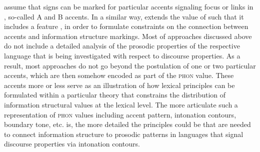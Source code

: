 \documentclass[output=paper,biblatex,babelshorthands,newtxmath,draftmode,colorlinks,citecolor=brown]{langscibook}
\begin{document}
\citet{EV96a} assume that signs can be marked for particular accents
signaling focus or links in , so-called A and B accents.
In a similar way, \citet{deKuthy2002a} extends the value of
 such that it includes a feature
, in order to formulate constraints on
the connection between accents and information structure markings.
Most of approaches discussed above do not include a detailed analysis
of the prosodic properties of the respective language that is being
investigated with respect to discourse properties. As a result, most
approaches do not go beyond the postulation of one or two particular
accents, which are then somehow encoded as part of the \textsc{phon}
value. These accents more or less serve as an illustration of how lexical
principles can be formulated within a particular theory that constrains
the distribution of information structural values at the lexical
level. The more articulate such a representation of \textsc{phon}
values including accent pattern, intonation contours, boundary tone,
etc. is, the more detailed the principles could be that are needed to
connect information structure to prosodic patterns in languages that
signal discourse properties via intonation contours.
\end{document}
